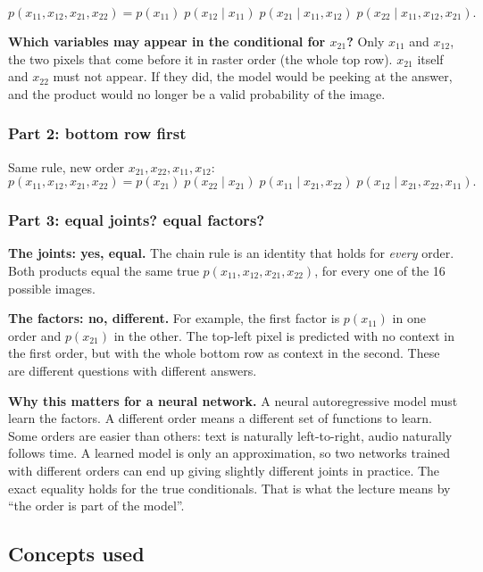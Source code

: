 \documentclass[12pt,a4paper]{article}
\begin{document}
\[
p(x_{11}, x_{12}, x_{21}, x_{22}) = p(x_{11})\; p(x_{12} \mid x_{11})\; p(x_{21} \mid x_{11}, x_{12})\; p(x_{22} \mid x_{11}, x_{12}, x_{21}).
\]

\textbf{Which variables may appear in the conditional for $x_{21}$?} Only $x_{11}$ and $x_{12}$, the two pixels that come before it in raster order (the whole top row). $x_{21}$ itself and $x_{22}$ must not appear. If they did, the model would be peeking at the answer, and the product would no longer be a valid probability of the image.

\subsubsection{Part 2: bottom row first}

Same rule, new order $x_{21}, x_{22}, x_{11}, x_{12}$:
\[
p(x_{11}, x_{12}, x_{21}, x_{22}) = p(x_{21})\; p(x_{22} \mid x_{21})\; p(x_{11} \mid x_{21}, x_{22})\; p(x_{12} \mid x_{21}, x_{22}, x_{11}).
\]

\subsubsection{Part 3: equal joints? equal factors?}

\textbf{The joints: yes, equal.} The chain rule is an identity that holds for \emph{every} order. Both products equal the same true $p(x_{11}, x_{12}, x_{21}, x_{22})$, for every one of the 16 possible images.

\textbf{The factors: no, different.} For example, the first factor is $p(x_{11})$ in one order and $p(x_{21})$ in the other. The top-left pixel is predicted with no context in the first order, but with the whole bottom row as context in the second. These are different questions with different answers.

\textbf{Why this matters for a neural network.} A neural autoregressive model must learn the factors. A different order means a different set of functions to learn. Some orders are easier than others: text is naturally left-to-right, audio naturally follows time. A learned model is only an approximation, so two networks trained with different orders can end up giving slightly different joints in practice. The exact equality holds for the true conditionals. That is what the lecture means by ``the order is part of the model''.

\subsection{Concepts used}
\end{document}
